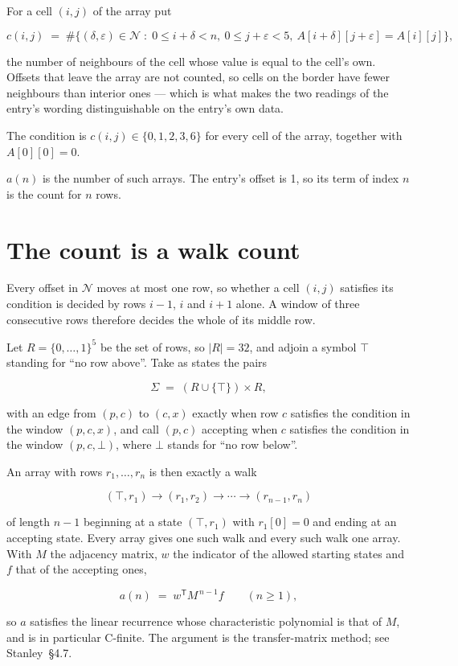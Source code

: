 \documentclass[11pt]{article}
\theoremstyle{definition}
\begin{document}
For a cell $(i,j)$ of the array put

\[c(i,j) \;=\; \#\bigl\{(\delta,\varepsilon)\in\mathcal{N} \;:\; 0\le i+\delta<n,\ 0\le j+\varepsilon<5,\ A[i+\delta][j+\varepsilon] = A[i][j]\bigr\},\]

the number of neighbours of the cell whose value is equal to the cell's own. Offsets that leave the array are not counted, so cells on the border have fewer neighbours than interior ones --- which is what makes the two readings of the entry's wording distinguishable on the entry's own data.

The condition is $c(i,j) \in \{0, 1, 2, 3, 6\}$ for every cell of the array, together with $A[0][0]=0$.

$a(n)$ is the number of such arrays. The entry's offset is 1, so its term of index $n$ is the count for $n$ rows.

\section{The count is a walk count}

Every offset in $\mathcal{N}$ moves at most one row, so whether a cell $(i,j)$ satisfies its condition is decided by rows $i-1$, $i$ and $i+1$ alone. A window of three consecutive rows therefore decides the whole of its middle row.

Let $R = \{0,\dots,1\}^{5}$ be the set of rows, so $|R| = 32$, and adjoin a symbol $\top$ standing for ``no row above''. Take as states the pairs

\[\Sigma \;=\; (R \cup \{\top\}) \times R,\]

with an edge from $(p,c)$ to $(c,x)$ exactly when row $c$ satisfies the condition in the window $(p,c,x)$, and call $(p,c)$ accepting when $c$ satisfies the condition in the window $(p,c,\bot)$, where $\bot$ stands for ``no row below''.

An array with rows $r_1,\dots,r_n$ is then exactly a walk

\[(\top,r_1) \to (r_1,r_2) \to \cdots \to (r_{n-1},r_n)\]

of length $n-1$ beginning at a state $(\top,r_1)$ with $r_1[0]=0$ and ending at an accepting state. Every array gives one such walk and every such walk one array. With $M$ the adjacency matrix, $w$ the indicator of the allowed starting states and $f$ that of the accepting ones,

\[a(n) \;=\; w^{\mathsf T} M^{\,n-1} f \qquad (n \ge 1),\]

so $a$ satisfies the linear recurrence whose characteristic polynomial is that of $M$, and is in particular C-finite. The argument is the transfer-matrix method; see Stanley~\S4.7.
\end{document}
